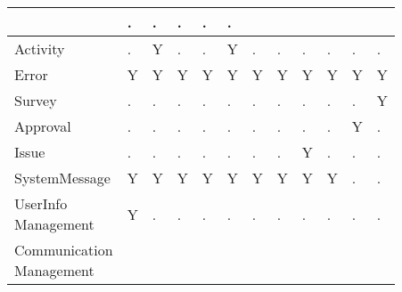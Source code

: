 {\begin{table}[htbp]
\begin{tabular}{|p{6.3em}|p{2em}|p{2em}|p{2em}|p{2em}|p{2em}|
                            p{2em}|p{2em}|p{2em}|p{2em}|p{2em}|p{2em}|}
                                    & .   & .     & .
                                    & .   & .     \\
                \hline
                Activity            & .   & Y     & . 
                                    & .   & Y     & .
                                    & .   & .     & .
                                    & .   & .     \\
                \hline
                Error               & Y   & Y     & Y 
                                    & Y   & Y     & Y
                                    & Y   & Y     & Y
                                    & Y   & Y     \\
                \hline
                Survey              & .   & .     & . 
                                    & .   & .     & .
                                    & .   & .     & .
                                    & .   & Y     \\
                \hline
                Approval            & .   & .     & . 
                                    & .   & .     & .
                                    & .   & .     & .
                                    & Y   & .     \\
                \hline
                Issue               & .   & .     & . 
                                    & .   & .     & .
                                    & .   & Y     & .
                                    & .   & .     \\
                \hline
                SystemMessage       & Y   & Y     & Y 
                                    & Y   & Y     & Y
                                    & Y   & Y     & Y
                                    & .   & .     \\
                \hline
                \tabincell{l}{UserInfo \\ Management}
                  & Y   & .     & .
                                    & .   & .     & .
                                    & .   & .     & .
                                    & .   & .     \\
                \hline
                \tabincell{l}{Communication \\ Management}
                

\end{tabular}
\end{table}}
